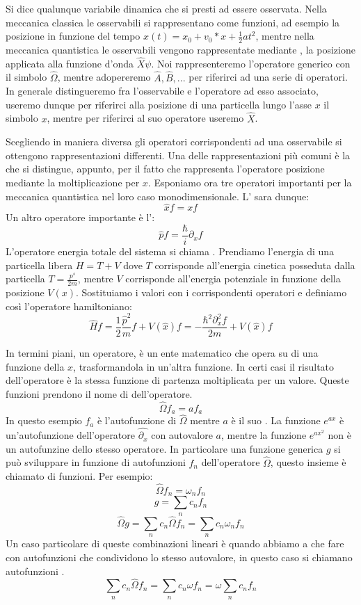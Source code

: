 Si dice  qualunque variabile dinamica che si presti ad essere osservata. Nella meccanica classica le osservabili si rappresentano come funzioni, ad esempio la posizione in funzione del tempo $x(t) = x_0 + v_0 * x + \frac{1}{2} a t^2$, mentre nella meccanica quantistica le osservabili vengono rappresentate mediante , la posizione applicata alla funzione d'onda $\hat{X}\psi$. Noi rappresenteremo l'operatore generico con il simbolo $\hat{\Omega}$, mentre adopereremo $\hat{A}, \hat{B}, ...$ per riferirci ad una serie di operatori. In generale distingueremo fra l'osservabile e l'operatore ad esso associato, useremo dunque per riferirci alla posizione di una particella lungo l'asse $x$ il simbolo $x$, mentre per riferirci al suo operatore useremo $\hat{X}$.

Scegliendo in maniera diversa gli operatori corrispondenti ad una osservabile si ottengono rappresentazioni differenti. Una delle rappresentazioni più comuni è la  che si distingue, appunto, per il fatto che rappresenta l'operatore posizione mediante la moltiplicazione per $x$. Esponiamo ora tre operatori importanti per la meccanica quantistica nel loro caso monodimensionale. L' sara dunque:
$$\hat{x} f = x f$$
Un altro operatore importante è l':
$$\hat{p} f = \frac{\hbar}{i} \partial_x f$$
L'operatore energia totale del sistema si chiama . Prendiamo l'energia di una particella libera $H = T + V$ dove $T$ corrisponde all'energia cinetica posseduta dalla particella $T = \frac{p^s}{2 m}$, mentre $V$ corrisponde all'energia potenziale in funzione della posizione $V(x)$. Sostituiamo i valori con i corrispondenti operatori e definiamo così l'operatore hamiltoniano:
$$\hat{H} f = \frac{1}{2}\frac{\hat{p}^2}{m} f + V(\hat{x}) f = -\frac{\hbar^2 \partial_x^2 f}{2 m} + V(\hat{x}) f$$

In termini piani, un operatore, è un ente matematico che opera su di una funzione della $x$, trasformandola in un'altra funzione. In certi casi il risultato dell'operatore è la stessa funzione di partenza moltiplicata per un valore. Queste funzioni prendono il nome di  dell'operatore.
$$\hat{\Omega} f_a = a f_a$$
In questo esempio $f_a$ è l'autofunzione di $\hat{\Omega}$ mentre $a$ è il suo . La funzione $e^{ax}$ è un'autofunzione dell'operatore $\hat{\partial{}_x}$ con autovalore $a$, mentre la funzione $e^{ax^2}$ non è un autofunzine dello stesso operatore. In particolare una funzione generica $g$ si può sviluppare in funzione di autofunzioni $f_n$ dell'operatore $\hat{\Omega}$, questo insieme è chiamato  di funzioni. Per esempio:
$$\hat{\Omega} f_n = \omega_n f_n$$
$$g = \sum_n c_n f_n$$
$$\hat{\Omega} g = \sum_n c_n \hat{\Omega} f_n = \sum_n c_n \omega_n f_n$$
Un caso particolare di queste combinazioni lineari è quando abbiamo a che fare con autofunzioni che condividono lo stesso autovalore, in questo caso si chiamano autofunzioni .
$$\sum_n c_n \hat{\Omega} f_n = \sum_n c_n \omega f_n = \omega \sum_n c_n f_n$$

